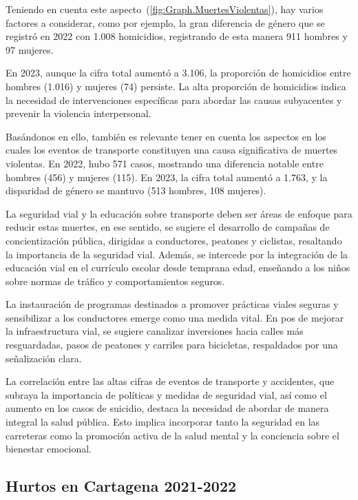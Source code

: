 \documentclass[letterpaper, 12pt]{article}
\begin{document}
Teniendo en cuenta este
aspecto~(\ref{fig:Graph.MuertesViolentas}), hay varios
factores a considerar, como por ejemplo, la gran diferencia
de género que se registró en 2022 con 1.008 homicidios,
registrando de esta manera 911 hombres y 97 mujeres.

En 2023, aunque la cifra total aumentó a 3.106, la
proporción de homicidios entre hombres (1.016) y mujeres
(74) persiste. La alta proporción de homicidios indica la
necesidad de intervenciones específicas para abordar las
causas subyacentes y prevenir la violencia interpersonal.

Basándonos en ello, también es relevante tener en cuenta
los aspectos en los cuales los eventos de transporte
constituyen una causa significativa de muertes violentas.
En 2022, hubo 571 casos, mostrando una diferencia notable
entre hombres (456) y mujeres (115). En 2023, la cifra
total aumentó a 1.763, y la disparidad de género se mantuvo
(513 hombres, 108 mujeres).

La seguridad vial y la educación sobre transporte deben ser
áreas de enfoque para reducir estas muertes, en ese
sentido, se sugiere el desarrollo de campañas de
concientización pública, dirigidas a conductores, peatones
y ciclistas, resaltando la importancia de la seguridad
vial. Además, se intercede por la integración de la
educación vial en el currículo escolar desde temprana edad,
enseñando a los niños sobre normas de tráfico y
comportamientos seguros.

La instauración de programas destinados a promover
prácticas viales seguras y sensibilizar a los conductores
emerge como una medida vital. En pos de mejorar la
infraestructura vial, se sugiere canalizar inversiones
hacia calles más resguardadas, pasos de peatones y carriles
para bicicletas, respaldados por una señalización clara.

La correlación entre las altas cifras de eventos de
transporte y accidentes, que subraya la importancia de
políticas y medidas de seguridad vial, así como el aumento
en los casos de suicidio, destaca la necesidad de abordar
de manera integral la salud pública. Esto implica
incorporar tanto la seguridad en las carreteras como la
promoción activa de la salud mental y la conciencia sobre
el bienestar emocional.


\subsection*{Hurtos en Cartagena 2021-2022}
\end{document}
